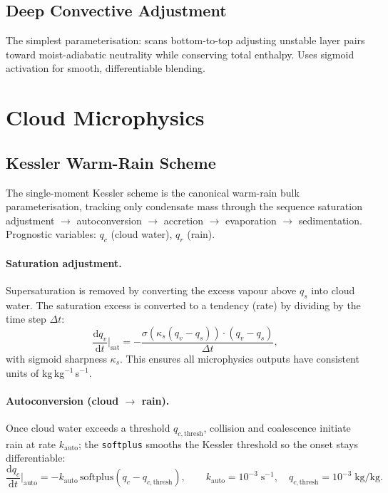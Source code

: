 \documentclass[11pt,twoside]{report}
\newcommand{\dd}{\mathrm{d}}
\begin{document}
\subsection{Deep Convective Adjustment}

The simplest parameterisation: scans bottom-to-top adjusting unstable
layer pairs toward moist-adiabatic neutrality while conserving total
enthalpy.  Uses sigmoid activation for smooth, differentiable blending.


\section{Cloud Microphysics}
\label{sec:microphysics}

\subsection{Kessler Warm-Rain Scheme}

The single-moment Kessler scheme \citep{Kessler1969} is the canonical
warm-rain bulk parameterisation, tracking only condensate mass through the
sequence saturation adjustment $\to$ autoconversion $\to$ accretion $\to$
evaporation $\to$ sedimentation. Prognostic variables: $q_c$ (cloud water),
$q_r$ (rain).

\paragraph{Saturation adjustment.}
Supersaturation is removed by converting the excess vapour above $q_s$ into
cloud water. The saturation excess is converted to a tendency (rate) by
dividing by the time step $\Delta t$:
\begin{equation}
  \frac{\dd q_v}{\dd t}\bigg|_{\mathrm{sat}}
  = -\frac{\sigma(\kappa_s(q_v-q_s))\cdot(q_v-q_s)}{\Delta t},
\end{equation}
with sigmoid sharpness $\kappa_s$.  This ensures all microphysics outputs
have consistent units of kg\,kg$^{-1}$\,s$^{-1}$.

\paragraph{Autoconversion (cloud $\to$ rain).}
Once cloud water exceeds a threshold $q_{c,\mathrm{thresh}}$, collision and
coalescence initiate rain at rate $k_{\mathrm{auto}}$; the \texttt{softplus}
smooths the Kessler threshold so the onset stays differentiable:
\begin{equation}
  \frac{\dd q_c}{\dd t}\bigg|_{\mathrm{auto}}
  = -k_{\mathrm{auto}}\,\mathrm{softplus}(q_c - q_{c,\mathrm{thresh}}),
  \qquad k_{\mathrm{auto}}=10^{-3}\;\text{s}^{-1},\quad
  q_{c,\mathrm{thresh}}=10^{-3}\;\text{kg/kg}.
\end{equation}
\end{document}
